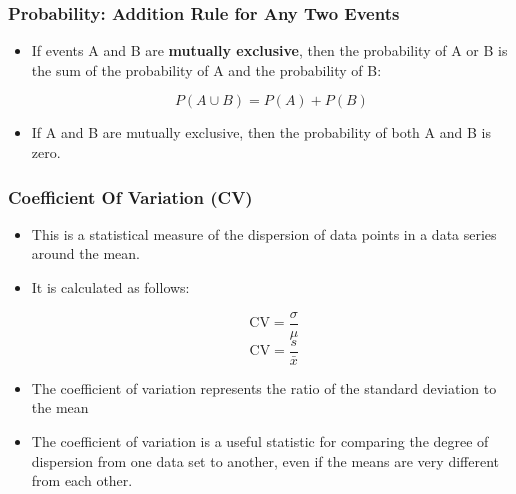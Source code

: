 \documentclass{beamer}
\begin{document}
\begin{frame}
\frametitle{Probability: Addition Rule for Any Two Events}
\Large
\begin{itemize}
\item If events A and B are \textbf{mutually exclusive}, then the probability of A or B is the sum of the probability of A and the probability of B:

\[P(A \cup B) = P(A) + P(B)\]

\item If A and B are mutually exclusive, then the probability of both A and B is zero.
\end{itemize}
\end{frame}
\begin{frame}
\frametitle{Coefficient Of Variation (CV)}
\Large
\begin{itemize}
\item This is a statistical measure of the dispersion of data points in a data series around the mean. 
\item It is calculated as follows:

\[  \mbox{ CV}  = \frac{\sigma}{\mu}  \]
\[  \mbox{ CV}  = \frac{s}{\bar{x}}  \]

\item The coefficient of variation represents the ratio of the standard deviation to the mean

\item The coefficient of variation is a useful statistic for comparing the degree of dispersion from one data set
 to another, even if the means are very different from each other.
\end{itemize}
\end{frame}
\end{document}
